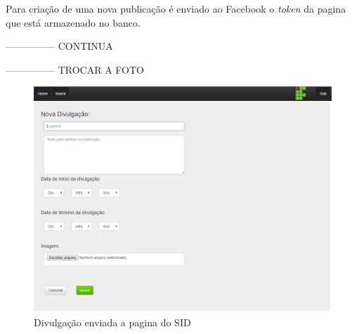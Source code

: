 Para criação de uma nova publicação é enviado ao Facebook o \textit{token} da pagina que está armazenado no banco.

--------------- CONTINUA


--------------- TROCAR A FOTO

 \begin{figure}[!htb]
\centering
\includegraphics[scale=0.6]{figuras/administrador1}
\caption{Divulgação enviada a pagina do SID}
\label{Rotulo}
\end{figure}
